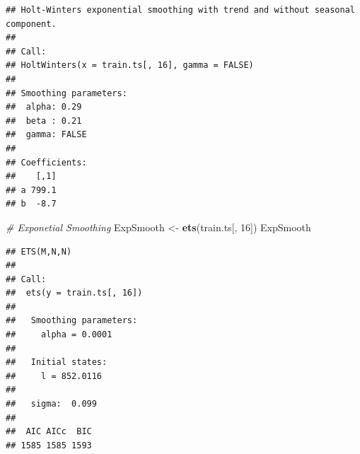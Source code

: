 \documentclass[12pt,openany]{book}
\newenvironment{Shaded}{\begin{snugshade}}{\end{snugshade}}
\newcommand{\CommentTok}[1]{\textcolor[rgb]{0.56,0.35,0.01}{\textit{#1}}}
\newcommand{\DecValTok}[1]{\textcolor[rgb]{0.00,0.00,0.81}{#1}}
\newcommand{\KeywordTok}[1]{\textcolor[rgb]{0.13,0.29,0.53}{\textbf{#1}}}
\newcommand{\NormalTok}[1]{#1}
\newcommand{\StringTok}[1]{\textcolor[rgb]{0.31,0.60,0.02}{#1}}
\begin{document}
\begin{verbatim}
## Holt-Winters exponential smoothing with trend and without seasonal component.
## 
## Call:
## HoltWinters(x = train.ts[, 16], gamma = FALSE)
## 
## Smoothing parameters:
##  alpha: 0.29
##  beta : 0.21
##  gamma: FALSE
## 
## Coefficients:
##    [,1]
## a 799.1
## b  -8.7
\end{verbatim}

\begin{Shaded}
\begin{Highlighting}[]
\CommentTok{# Exponetial Smoothing}
\NormalTok{ExpSmooth <-}\StringTok{ }\KeywordTok{ets}\NormalTok{(train.ts[, }\DecValTok{16}\NormalTok{])}
\NormalTok{ExpSmooth}
\end{Highlighting}
\end{Shaded}

\begin{verbatim}
## ETS(M,N,N) 
## 
## Call:
##  ets(y = train.ts[, 16]) 
## 
##   Smoothing parameters:
##     alpha = 0.0001 
## 
##   Initial states:
##     l = 852.0116 
## 
##   sigma:  0.099
## 
##  AIC AICc  BIC 
## 1585 1585 1593
\end{verbatim}
\end{document}
